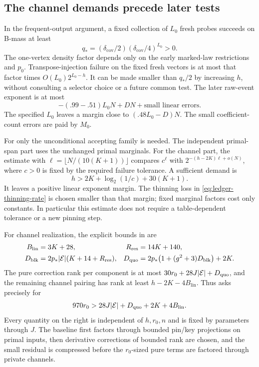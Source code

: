 \subsection{The channel demands precede later tests}

In the frequent-output argument, a fixed collection of \(L_0\)
fresh probes succeeds on B-mass at least
\begin{equation}
       q_*=(\delta_{\mathrm{cov}}/2)
              (\delta_{\mathrm{cov}}/4)^{L_0}>0.
 \label{eq:ledger-probe-mass}
\end{equation}
The one-vertex density factor depends only on the early marked-law
restrictions and \(p_0\).
Transpose-injection failure on the fixed fresh vectors is at most
that factor times \(O(L_0)2^{L_0-h}\).
It can be made smaller than \(q_*/2\) by increasing \(h\), without
consulting a selector choice or a future common test.
The later raw-event exponent is at most
\[
       -(.99-.51)L_0N+DN+\text{small linear errors}.
\]
The specified \(L_0\) leaves a margin close to \((.48L_0-D)N\).
The small coefficient-count errors are paid by \(M_0\).

For  only the unconditional accepting
family is needed.  The independent primal-span part uses the
unchanged primal marginals.  For the channel part, the
estimate with \(\ell=\lfloor N/(10(K+1))\rfloor\) compares
\(c^\ell\) with \(2^{-(h-2K)\ell+o(N)}\), where \(c>0\)
is fixed by the required failure tolerance.  A sufficient demand is
\begin{equation}\label{eq:ledger-injection-demand}
 h>2K+\log_2(1/c)+30(K+1).
\end{equation}
It leaves a positive linear exponent margin.  The thinning loss
in \eqref{eq:ledger-thinning-rate} is chosen smaller than that
margin; fixed marginal factors cost only constants.  In particular
this estimate does not require a table-dependent tolerance or a
new pinning step.

For channel realization, the explicit bounds in
are
\[
\begin{aligned}
 B_{\mathrm{lin}}&=3K+28,&
 R_{\mathrm{res}}&=14K+140,\\
 D_{\mathrm{blk}}&=2p_*|\mathcal E|(K+14+R_{\mathrm{res}}),&
 D_{\mathrm{quo}}&=2p_*\bigl(1+(g^2+3)D_{\mathrm{blk}}\bigr)+2K.
\end{aligned}
\]
The pure correction rank per component is at most
\(30r_0+28J|\mathcal E|+D_{\mathrm{quo}}\), and the remaining channel
pairing has rank at least \(h-2K-4B_{\mathrm{lin}}\).
Thus  asks precisely for
\begin{equation}
       970r_0>28J|\mathcal E|+D_{\mathrm{quo}}+2K+4B_{\mathrm{lin}}.
 \label{eq:ledger-realization-demand}
\end{equation}
Every quantity on the right is independent of \(h,r_0,n\)
and is fixed by parameters through \(J\).
The baseline first factors through bounded pin/key projections on
primal inputs, then derivative corrections of bounded rank are
chosen, and the small residual is compressed before the
\(r_0\)-sized pure terms are factored through private channels.

